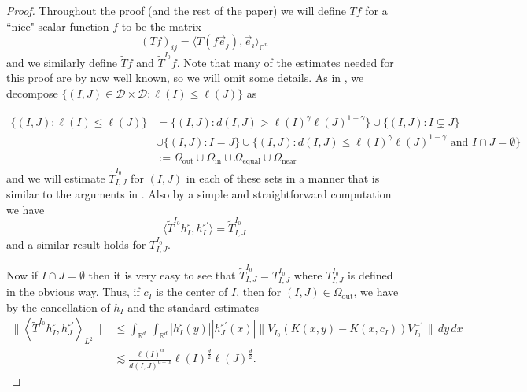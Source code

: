 \documentclass[12pt,reqno ]{amsart}
\numberwithin{equation}{section}
\theoremstyle{definition}
\newcommand{\C}{\ensuremath{\mathbb{C}^n}}
\newcommand{\Rd}{\ensuremath{\mathbb{R}^d}}
\newcommand{\D}{\ensuremath{\mathscr{D}}}
\newcommand{\V}[1]{\ensuremath{\vec{#1}}}
\newcommand{\ip}[2]{\ensuremath{\left\langle#1,#2\right\rangle}}
\newcommand{\W}[1]{\ensuremath{\widetilde{#1}}}
\newcommand{\T}[1]{\ensuremath{\text{#1}}}
\begin{document}
\begin{proof}
 Throughout the proof (and the rest of the paper) we will define $Tf$ for a ``nice" scalar function $f$ to be the matrix \begin{equation*} (Tf)_{ij} = \langle T(f \V{e}_j), \V{e}_i \rangle_{\C} \end{equation*} and we similarly define $\W{T} f$ and $\W{T}^{I_0} f$.   Note that many of the estimates needed for this proof are by now well known, so we will omit some details.  As in \cite{H}, we decompose $\{(I, J) \in \D \times \D : \ell(I) \leq \ell(J)\}$ as

\begin{align*} \{(I, J) : \ell(I) \leq \ell(J) \} & = \{(I, J) : d(I, J) > \ell(I) ^\gamma \ell(J)^{1 - \gamma} \} \cup \{(I, J) : I \subsetneq J \}  \\ & \cup \{(I, J) : I = J \} \cup \{(I, J) : d(I, J) \leq \ell(I) ^\gamma \ell(J)^{1 - \gamma} \T{ and } I \cap J = \emptyset \} \\ & := \Omega_{\T{out}} \cup \Omega_{\T{in}} \cup   \Omega_{\T{equal}} \cup \Omega_{\T{near}} \end{align*} and we will estimate $\W{T}^{I_0} _{I, J}$ for $(I, J)$ in each of these sets in a manner that is similar to the arguments in \cite{H}. Also by a simple and straightforward computation we have \begin{equation*} \langle \W{T} ^{I_0} h_I ^\varepsilon ,   h_I ^{\varepsilon'} \rangle = \W{T}_{I, J} ^{I_0} \end{equation*} and a similar result holds for ${T}_{I, J} ^{I_0}$.

Now if $I \cap J = \emptyset$ then it is very easy to see that $\W{T}^{I_0} _{I, J}  = {T}^{I_0} _{I, J}$ where ${T}^{I_0} _{I, J}$ is defined in the obvious way.  Thus, if $c_I$ is the center of $I$, then for $(I, J) \in \Omega_{\T{out}}$, we have by the cancellation of $h_I$ and the standard estimates\begin{align*}  \|\ip{\W{T}^{I_0} h_I ^{\varepsilon}}{h_J ^{\varepsilon'}} _{L^2}\|   & \leq \int_{\Rd} \, \int_{\Rd} |h_I ^{\varepsilon}(y) | | h_J ^{\varepsilon'}(x)| \|V_{I_0} (K(x, y)   -  K(x, c_I)) V_{I_0} ^{-1} \| \, dy \, dx \\ & \lesssim \frac{\ell(I)^\alpha}{d(I, J) ^{d + \alpha}}  \ell(I)^{\frac{d}{2}} \ell(J)^{\frac{d}{2}}. \end{align*}



\end{proof}
\end{document}

